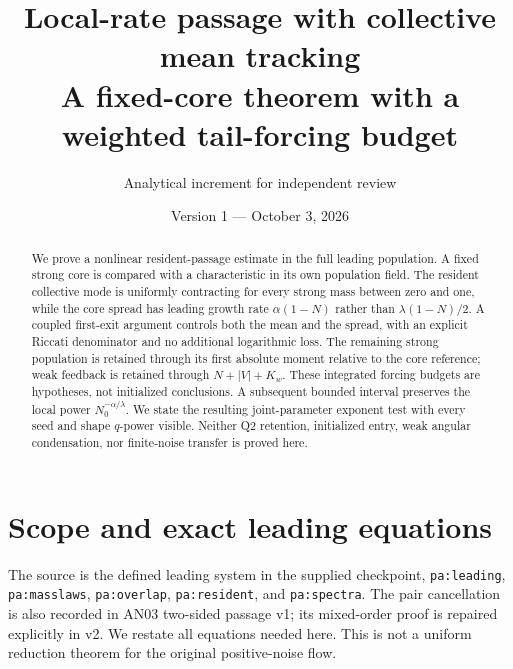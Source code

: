 \documentclass[11pt]{article}
\title{Local-rate passage with collective mean tracking\\
\large A fixed-core theorem with a weighted tail-forcing budget}
\author{Analytical increment for independent review}
\date{Version 1 --- October 3, 2026}
\numberwithin{equation}{section}
\theoremstyle{remark}\newtheorem{remark}[theorem]{Remark}
\begin{document}
\maketitle
\begin{abstract}
We prove a nonlinear resident-passage estimate in the full leading
population. A fixed strong core is compared with a characteristic in
its own population field. The resident collective mode is uniformly
contracting for every strong mass between zero and one, while the core
spread has leading growth rate $\alpha(1-N)$ rather than
$\lambda(1-N)/2$. A coupled first-exit argument controls both the mean
and the spread, with an explicit Riccati denominator and no additional
logarithmic loss. The remaining strong population is retained through
its first absolute moment relative to the core reference; weak feedback
is retained through $N+|V|+K_w$. These integrated forcing budgets are
hypotheses, not initialized conclusions. A subsequent bounded interval
preserves the local power $N_0^{-\alpha/\lambda}$. We state the resulting
joint-parameter exponent test with every seed and shape $q$-power
visible. Neither Q2 retention, initialized entry, weak angular
condensation, nor finite-noise transfer is proved here.
\end{abstract}

\section{Scope and exact leading equations}\label{inc:AN03:local:v1:contract}
The source is the defined leading system in the supplied checkpoint,
\texttt{pa:leading}, \texttt{pa:masslaws}, \texttt{pa:overlap},
\texttt{pa:resident}, and \texttt{pa:spectra}. The pair cancellation is
also recorded in AN03 two-sided passage v1; its mixed-order proof is
repaired explicitly in v2. We restate all equations needed here. This is
not a uniform reduction theorem for the original positive-noise flow.
\end{document}
